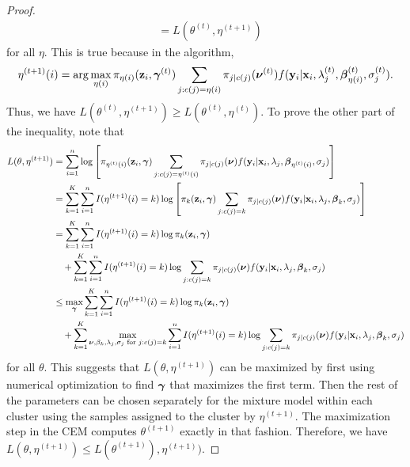 \begin{proof}
\begin{align*}
  &= L(\theta^{(t)},\eta^{(t+1)})
    \end{align*}
for all $\eta$. This is true because in the algorithm, $$\eta^{(t+1)}(i) = \arg \max_{\eta(i)} \pi_{\eta(i)}(\mathbf z_{i},\boldsymbol \gamma^{(t)})\sum_{j:c(j)=\eta(i)}\pi_{j|c(j)}(\boldsymbol\nu^{(t)})f(\mathbf y_{i}|\mathbf x_{i},\lambda_{j}^{(t)},\boldsymbol\beta^{(t)}_{\eta(i)},\sigma^{(t)}_{j}).$$
   Thus, we have $    L(\theta^{(t)},\eta^{(t+1)})\geq L(\theta^{(t)},\eta^{(t)})$. To prove the other part of the inequality, note that
       \begin{align*}
 L(\theta,\eta^{(t+1)})  &= \sum^{n}_{i=1}\log\left[\pi_{\eta^{(t)}(i)}(\mathbf z_{i},\boldsymbol \gamma)\sum_{j:c(j)=\eta^{(t)}(i)}\pi_{j|c(j)}(\boldsymbol\nu)f(\mathbf y_{i}|\mathbf x_{i},\lambda_{j},\boldsymbol\beta_{\eta^{(t)}(i)},\sigma_{j})\right]\\
 &= \sum^{K}_{k=1}\sum^{n}_{i=1}I(\eta^{(t+1)}(i) = k)\log\left[\pi_{k}(\mathbf z_{i},\boldsymbol \gamma)\sum_{j:c(j)=k}\pi_{j|c(j)}(\boldsymbol\nu)f(\mathbf y_{i}|\mathbf x_{i},\lambda_{j},\boldsymbol\beta_{k},\sigma_{j})\right]\\
  &= \sum^{K}_{k=1}\sum^{n}_{i=1}I(\eta^{(t+1)}(i) = k)\log\pi_{k}(\mathbf z_{i},\boldsymbol \gamma)\\
  &\quad+\sum^{K}_{k=1}\sum^{n}_{i=1}I(\eta^{(t+1)}(i) = k)\log \sum_{j:c(j)=k}\pi_{j|c(j)}(\boldsymbol\nu)f(\mathbf y_{i}|\mathbf x_{i},\lambda_{j},\boldsymbol\beta_{k},\sigma_{j})\\
    &\leq\max_{\boldsymbol\gamma} \sum^{K}_{k=1}\sum^{n}_{i=1}I(\eta^{(t+1)}(i) = k)\log\pi_{k}(\mathbf z_{i},\boldsymbol \gamma)\\
  &\quad+\sum^{K}_{k=1}\max_{\boldsymbol \nu,\beta_{k},\lambda_{j},\sigma_{j}\text{ for }j:c(j)=k}\sum^{n}_{i=1}I(\eta^{(t+1)}(i) = k)\log \sum_{j:c(j)=k}\pi_{j|c(j)}(\boldsymbol\nu)f(\mathbf y_{i}|\mathbf x_{i},\lambda_{j},\boldsymbol\beta_{k},\sigma_{j})\\
    \end{align*}
    for all $\theta$. This suggests that $L(\theta,\eta^{(t+1)})$ can be maximized by first using numerical optimization to find $\boldsymbol\gamma$ that maximizes the first term. Then the rest of the parameters can be chosen separately for the mixture model within each cluster using the samples assigned to the cluster by $\eta^{(t+1)}$. The maximization step in the CEM computes $\theta^{(t+1)}$ exactly in that fashion. Therefore, we have $L(\theta,\eta^{(t+1)})\leq L(\theta^{(t+1)}),\eta^{(t+1)})$. 
    \end{proof}